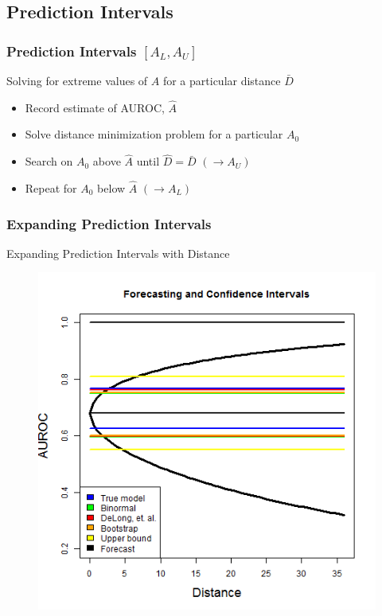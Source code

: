 \documentclass{beamer}
\begin{document}


\subsection{Prediction Intervals}



\begin{frame}
\frametitle{Prediction Intervals $[A_L, A_U]$}

Solving for extreme values of $A$ for a particular distance $\bar{D}$
\begin{itemize}
    \item Record estimate of AUROC, $\hat{A}$
    \item Solve distance minimization problem for a particular $A_0$
    \item Search on $A_0$ above $\hat{A}$ until $\hat{D} = \bar{D}$ $(\rightarrow A_U)$
    \item Repeat for $A_0$ below $\hat{A}$ $(\rightarrow A_L)$
\end{itemize}

\end{frame}


\begin{frame}
\frametitle{Expanding Prediction Intervals}

Expanding Prediction Intervals with Distance
\begin{figure}
    \includegraphics[scale =  0.5 ]{Figs/Forecast_int_1.png}
\end{figure}

\end{frame}
\end{document}
